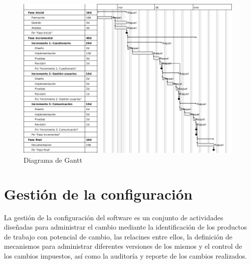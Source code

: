 \begin{landscape}

\begin{figure}[htbp] 
    \centering
    \includegraphics[height=\textwidth,keepaspectratio]{figuras/gantt_v2_en.png}
    \caption{Diagrama de Gantt}
    \label{fig:gantt}
\end{figure}	

\end{landscape}


\section{Gestión de la configuración}
La gestión de la configuración del software es un conjunto de actividades diseñadas para administrar el cambio mediante la identificación de los productos de trabajo con potencial de cambio, las relacines entre ellos, la definición de mecanismos para administrar diferentes versiones de los mismos y el control de los cambios impuestos, así como la auditoría y reporte de los cambios realizados\cite{pressman}.

